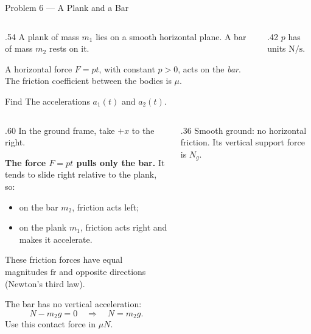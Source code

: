\begin{frame}{Problem 6 — A Plank and a Bar}
  \par
  \small
  \begin{columns}[T,onlytextwidth]
    \begin{column}{.54\textwidth}
      A plank of mass \(m_1\) lies on a smooth horizontal plane.
      A bar of mass \(m_2\) rests on it.

      \medskip
      A horizontal force \(F=pt\), with constant \(p>0\), acts on the
      \emph{bar}. The friction coefficient between the bodies is \(\mu\).

      \medskip
      \begin{block}{Find}
        The accelerations \(a_1(t)\) and \(a_2(t)\).
      \end{block}

    \end{column}
    \begin{column}{.42\textwidth}
      \medskip
      \(p\) has units \(\si{\newton\per\second}\).
    \end{column}
  \end{columns}
\end{frame}

\begin{solutionframe}
  \begin{columns}[T,onlytextwidth]
    \begin{column}{.60\textwidth}
      In the ground frame, take \(+x\) to the right.

      \medskip
      \textbf{The force \(F=pt\) pulls only the bar.}
      It tends to slide right relative to the plank, so:
      \begin{itemize}
        \item on the bar \(m_2\), friction acts left;
        \item on the plank \(m_1\), friction acts right and makes it accelerate.
      \end{itemize}
      These friction forces have equal magnitudes \(\mathrm{fr}\)
      and opposite directions (Newton's third law).

      \medskip
      The bar has no vertical acceleration:
      \[
        N-m_2g=0\quad\Rightarrow\quad N=m_2g.
      \]
      Use this contact force in \(\mu N\).
    \end{column}
    \begin{column}{.36\textwidth}
      \medskip
      Smooth ground: no horizontal friction.
      Its vertical support force is \(N_g\).
    \end{column}
  \end{columns}
\end{solutionframe}

